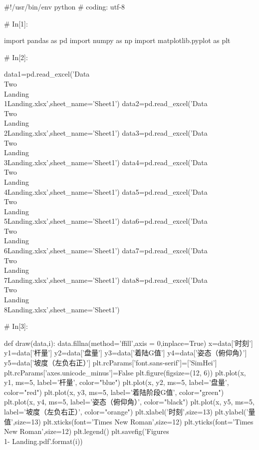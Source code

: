\documentclass{MathorCupModeling}
\begin{document}
\begin{python}
#!/usr/bin/env python
# coding: utf-8

# In[1]:


import pandas as pd
import numpy as np
import matplotlib.pyplot as plt


# In[2]:


data1=pd.read_excel('Data\\Two\\Landing\\1Landing.xlsx',sheet_name='Sheet1')
data2=pd.read_excel('Data\\Two\\Landing\\2Landing.xlsx',sheet_name='Sheet1')
data3=pd.read_excel('Data\\Two\\Landing\\3Landing.xlsx',sheet_name='Sheet1')
data4=pd.read_excel('Data\\Two\\Landing\\4Landing.xlsx',sheet_name='Sheet1')
data5=pd.read_excel('Data\\Two\\Landing\\5Landing.xlsx',sheet_name='Sheet1')
data6=pd.read_excel('Data\\Two\\Landing\\6Landing.xlsx',sheet_name='Sheet1')
data7=pd.read_excel('Data\\Two\\Landing\\7Landing.xlsx',sheet_name='Sheet1')
data8=pd.read_excel('Data\\Two\\Landing\\8Landing.xlsx',sheet_name='Sheet1')


# In[3]:


def draw(data,i):
    data.fillna(method='ffill',axis = 0,inplace=True)
    x=data['时刻']
    y1=data['杆量']
    y2=data['盘量']
    y3=data['着陆G值']
    y4=data['姿态（俯仰角）']
    y5=data['坡度（左负右正）']
    plt.rcParams['font.sans-serif']=['SimHei']
    plt.rcParams['axes.unicode_minus']=False
    plt.figure(figsize=(12, 6))
    plt.plot(x, y1, ms=5, label='杆量', color="blue")
    plt.plot(x, y2, ms=5, label='盘量', color="red")
    plt.plot(x, y3, ms=5, label='着陆阶段G值', color="green")
    plt.plot(x, y4, ms=5, label='姿态（俯仰角）', color="black")
    plt.plot(x, y5, ms=5, label='坡度（左负右正）', color="orange")
    plt.xlabel('时刻',size=13)
    plt.ylabel('量值',size=13)
    plt.xticks(font='Times New Roman',size=12)
    plt.yticks(font='Times New Roman',size=12)
    plt.legend()
    plt.savefig('Figures\\1-{} Landing.pdf'.format(i))



\end{python}
\end{document}
